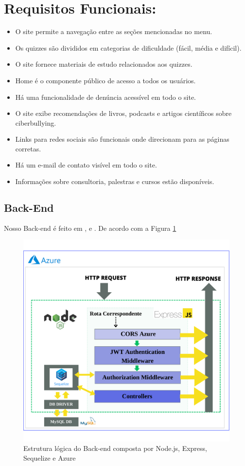 \section{Requisitos Funcionais:}
\begin{itemize}
  \item O site permite a navegação entre as seções mencionadas no menu.
  \item  Os quizzes são divididos em categorias de dificuldade (fácil, média e difícil).
  \item O site fornece materiais de estudo relacionados aos quizzes.
   \item Home é o componente público de acesso a todos os usuários.
   \item Há uma funcionalidade de denúncia acessível em todo o site.
   \item O site exibe recomendações de livros, podcasts e artigos científicos sobre ciberbullying.
   \item  Links para redes sociais são funcionais onde direcionam para as páginas corretas.
\item Há um e-mail de contato visível em todo o site.
\item Informações sobre consultoria, palestras e cursos estão disponíveis.
\end{itemize}

\label{sec:tech}


\subsection{Back-End}
Nosso Back-end é feito em \cite{Node.js}, \cite{Express} e \cite{Sequelize}. De acordo com a Figura \ref{fig:logicBack}

\begin{figure}[h]
    \centering
    \includegraphics[width=1.0\textwidth]{Figuras/Back.pdf}
    \caption{Estrutura lógica do Back-end composta por Node.js, Express, Sequelize e Azure}
    \label{fig:logicBack}
\end{figure}

